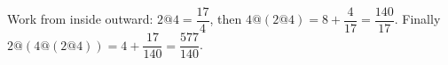 Work from inside outward: $2@4=\dfrac{17}{4}$, then $4@(2@4)=8+\dfrac{4}{17}=\dfrac{140}{17}$. Finally $2@(4@(2@4))=4+\dfrac{17}{140}=\boxed{\dfrac{577}{140}}$.
